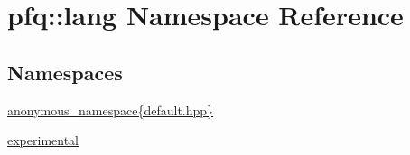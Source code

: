 \hypertarget{namespacepfq_1_1lang}{}\section{pfq\+:\+:lang Namespace Reference}
\label{namespacepfq_1_1lang}
\subsection*{Namespaces}
\begin{DoxyCompactItemize}
\item 
 \hyperlink{namespacepfq_1_1lang_1_1anonymous__namespace_02default_8hpp_03}{anonymous\+\_\+namespace\{default.\+hpp\}}
\item 
 \hyperlink{namespacepfq_1_1lang_1_1experimental}{experimental}
\end{DoxyCompactItemize}
